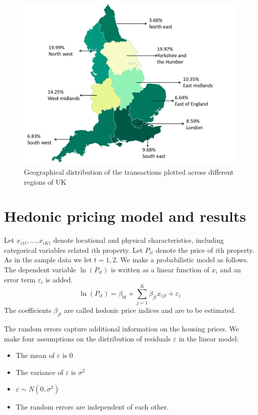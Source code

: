 \documentclass[12pt]{article}
\begin{document}
 \begin{figure}[H]
    \centering
    \includegraphics[width=17cm]{Rplot_geo.png}
    \caption{Geographical distribution of the transactions plotted across different regions of UK}
    \label{fig:geo_frac}
\end{figure}
 
\section{Hedonic pricing model and results}
\label{sec:hed}
Let $x_{i1t}, ..., x_{iKt}$ denote locational and physical characteristics, including categorical variables  related $i$th property. Let $P_{it}$ denote the price of $i$th property. As in the sample data we let $t=1, 2$. We make a probabilistic model as follows. The dependent variable $\ln (P_{it})$ is written as a linear function of $x_i$ and an error term $\varepsilon_i$ is added. 
$$\ln (P_{it})=\beta_{0t}+\sum_{j=1} ^{K} \beta_{jt}x_{ijt} +\varepsilon_i$$
The coefficients $\beta_{jt}$ are called hedonic price indices and are to be estimated.

The random errors capture additional information on the housing prices. We make four assumptions on the distribution of residuals $\varepsilon$ in the linear model:
\begin{itemize}
    \item The mean of $\varepsilon$ is 0
    \item The variance of $\varepsilon$ is $\sigma^2$
    \item $\varepsilon \sim N(0, \sigma^2)$
    \item The random errors are independent of each other.
\end{itemize}
\end{document}
